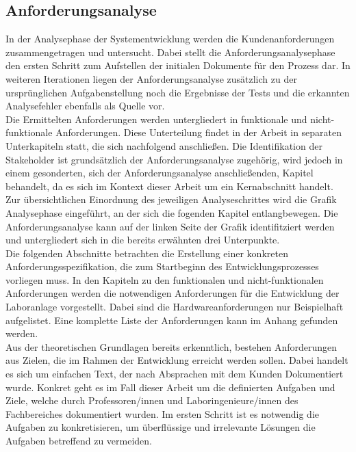 \documentclass[../Bachelorarbeit.tex]{subfiles}
\begin{document}
\subsection{Anforderungsanalyse}
In der Analysephase der Systementwicklung werden die Kundenanforderungen zusammengetragen und untersucht. %
Dabei stellt die Anforderungsanalysephase den ersten Schritt zum Aufstellen der initialen Dokumente für den Prozess dar. In weiteren Iterationen liegen der Anforderungsanalyse zusätzlich zu der ursprünglichen Aufgabenstellung noch die Ergebnisse der Tests und die erkannten Analysefehler ebenfalls als Quelle vor.\\
Die Ermittelten Anforderungen werden untergliedert in funktionale und nicht-funktionale Anforderungen. Diese Unterteilung findet in der Arbeit in separaten Unterkapiteln statt, die sich nachfolgend anschließen. Die Identifikation der Stakeholder ist grundsätzlich der Anforderungsanalyse zugehörig, wird jedoch in einem gesonderten, sich der Anforderungsanalyse anschließenden, Kapitel behandelt, da es sich im Kontext dieser Arbeit um ein Kernabschnitt handelt.\\
Zur übersichtlichen Einordnung des jeweiligen Analyseschrittes wird die Grafik Analysephase eingeführt, an der sich die fogenden Kapitel entlangbewegen. Die Anforderungsanalyse kann auf der linken Seite der Grafik identifitziert werden und untergliedert sich in die bereits erwähnten drei Unterpunkte.\\
Die folgenden Abschnitte betrachten die Erstellung einer konkreten Anforderungsspezifikation, die zum Startbeginn des Entwicklungsprozesses vorliegen muss. In den Kapiteln zu den funktionalen und nicht-funktionalen Anforderungen werden die notwendigen Anforderungen für die Entwicklung der Laboranlage vorgestellt. Dabei sind die Hardwareanforderungen nur Beispielhaft aufgelistet. Eine komplette Liste der Anforderungen kann im Anhang gefunden werden. \\
Aus der theoretischen Grundlagen bereits erkenntlich, bestehen Anforderungen aus Zielen, die im Rahmen der Entwicklung erreicht werden sollen. Dabei handelt es sich um einfachen Text, der nach Absprachen mit dem Kunden Dokumentiert wurde. Konkret geht es im Fall dieser Arbeit um die definierten Aufgaben und Ziele, welche durch Professoren/innen und Laboringenieure/innen des Fachbereiches dokumentiert wurden. Im ersten Schritt ist es notwendig die Aufgaben zu konkretisieren, um überflüssige und irrelevante Lösungen die Aufgaben betreffend zu vermeiden.\\
\end{document}
